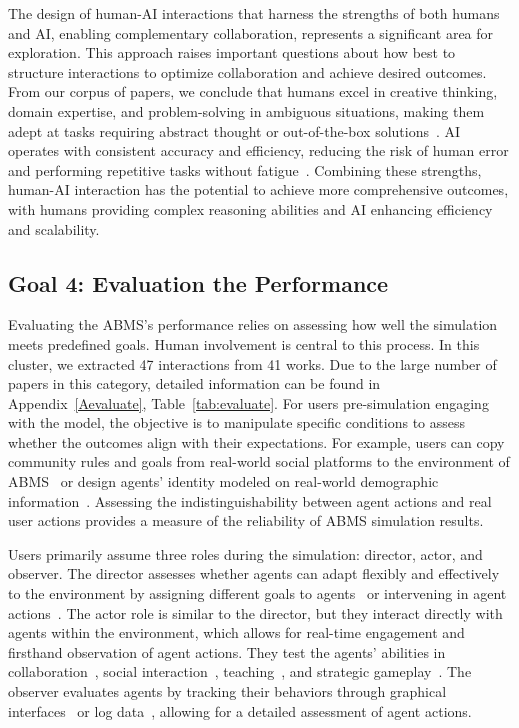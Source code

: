 The design of human-AI interactions that harness the strengths of both humans and AI, enabling complementary collaboration, represents a significant area for exploration. 
This approach raises important questions about how best to structure interactions to optimize collaboration and achieve desired outcomes.
From our corpus of papers, we conclude that humans excel in creative thinking, domain expertise, and problem-solving in ambiguous situations, making them adept at tasks requiring abstract thought or out-of-the-box solutions~\cite{ren2023robotsaskhelpuncertainty, 10.1145/2282338.2282384}.
AI operates with consistent accuracy and efficiency, reducing the risk of human error and performing repetitive tasks without fatigue~\cite{10.1145/3672539.3686351}.
Combining these strengths, human-AI interaction has the potential to achieve more comprehensive outcomes, with humans providing complex reasoning abilities and AI enhancing efficiency and scalability.


\subsection{Goal 4: Evaluation the Performance}
Evaluating the ABMS's performance relies on assessing how well the simulation meets predefined goals. Human involvement is central to this process.
In this cluster, we extracted 47 interactions from 41 works.
Due to the large number of papers in this category, detailed information can be found in Appendix~\ref{Aevaluate}, Table~\ref{tab:evaluate}.
For users pre-simulation engaging with the model, the objective is to manipulate specific conditions to assess whether the outcomes align with their expectations.
For example, users can copy community rules and goals from real-world social platforms to the environment of ABMS~\cite{10.1145/3526113.3545616} or design agents' identity modeled on real-world demographic information~\cite{10.1145/3394486.3412862, Argyle_Busby_Fulda_Gubler_Rytting_Wingate_2023}.
Assessing the indistinguishability between agent actions and real user actions provides a measure of the reliability of ABMS simulation results.

Users primarily assume three roles during the simulation: director, actor, and observer.
The director assesses whether agents can adapt flexibly and effectively to the environment by assigning different goals to agents~\cite{10.1145/3643505} or intervening in agent actions~\cite{10.1145/3610170, 10.1145/3613905.3651026}.
The actor role is similar to the director, but they interact directly with agents within the environment, which allows for real-time engagement and firsthand observation of agent actions.
They test the agents' abilities in collaboration~\cite{zhang2024buildingcooperativeembodiedagents}, social interaction~\cite{zhou2024sotopiainteractiveevaluationsocial}, teaching~\cite{saha2023languagemodelsteachweaker}, and strategic gameplay~\cite{NEURIPS2021_86e8f7ab,10.1145/3613905.3650853}.
The observer evaluates agents by tracking their behaviors through graphical interfaces~\cite{park2023choicematessupportingunfamiliaronline,lin2023agentsimsopensourcesandboxlarge,wang2023humanoidagentsplatformsimulating} or log data~\cite{babyagi}, allowing for a detailed assessment of agent actions.


